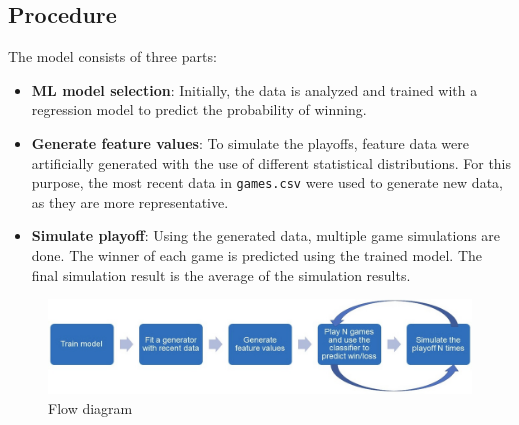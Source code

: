 \documentclass{article}
\begin{document}
\subsection{Procedure}
\label{section: Procedure}
The model consists of three parts:
\begin{itemize}
\item {\textbf{ML model selection}}: Initially, the data is analyzed and trained with a regression model to predict the probability of winning. 
\item {\textbf{Generate feature values}}: To simulate the playoffs, feature data were artificially generated with the use of different statistical distributions. For this purpose, the most recent data in \texttt{games.csv} were used to generate new data, as they are more representative.
\item {\textbf{Simulate playoff}}: Using the generated data, multiple game simulations are done. The winner of each game is predicted using the trained model. The final simulation result is the average of the simulation results.
\end{itemize}
\begin{figure}[H]
    \centering
    \includegraphics[width=\textwidth]{model/explain.jpeg}
    \caption{Flow diagram}
    \label{fig:modelExplain}
\end{figure}
\end{document}

